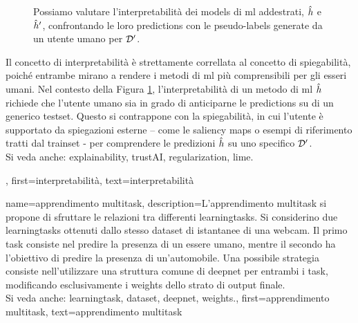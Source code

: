 {{\begin{figure}
\begin{center}
 		\caption{Possiamo valutare l'interpretabilità dei \glspl{model} di \gls{ml} addestrati, 
		$\hat{h}$ e $\hat{h}'$, confrontando le loro \glspl{prediction} 
		con le pseudo-\glspl{label} generate da un utente umano per $\mathcal{D}'$.
		\label{fig_aug_simulatability_dict}}
 		\end{center}
	 \end{figure} 
 	 Il concetto di interpretabilità è strettamente correllata al concetto di spiegabilità, 
 	 poiché entrambe mirano a rendere i metodi di \gls{ml} più comprensibili per gli esseri umani. 
	 Nel contesto della Figura \ref{fig_aug_simulatability_dict}, l'interpretabilità di un metodo di \gls{ml} 
	 $\hat{h}$ richiede che l’utente umano sia in grado di anticiparne le \glspl{prediction} 
	 su di un generico \gls{testset}. Questo si contrappone con la spiegabilità, in cui l’utente è supportato da spiegazioni esterne 
	 – come le saliency maps o esempi di riferimento tratti dal \gls{trainset} - 
	 per comprendere le predizioni $\hat{h}$ su uno specifico $\mathcal{D}'$. \\ 
	 Si veda anche: \gls{explainability}, \gls{trustAI}, \gls{regularization}, \gls{lime}.
},
 	first={interpretabilità},
 	text={interpretabilità}
 }
 
{name={apprendimento multitask},
	description={L'apprendimento multitask si propone di sfruttare le relazioni 
	tra differenti \glspl{learningtask}. Si considerino due \glspl{learningtask} ottenuti dallo  
	 	stesso \gls{dataset} di istantanee di una webcam. Il primo task consiste nel predire la presenza di un essere umano, 
		mentre il secondo ha l'obiettivo di predire la presenza di un'automobile. Una possibile strategia consiste nell'utilizzare 
		una struttura comune di \gls{deepnet} per entrambi i task, modificando esclusivamente i \gls{weights} dello strato di output finale.
	 			\\ 
		Si veda anche: \gls{learningtask}, \gls{dataset}, \gls{deepnet}, \gls{weights}.},
	first={apprendimento multitask},
	text={apprendimento multitask}
}

